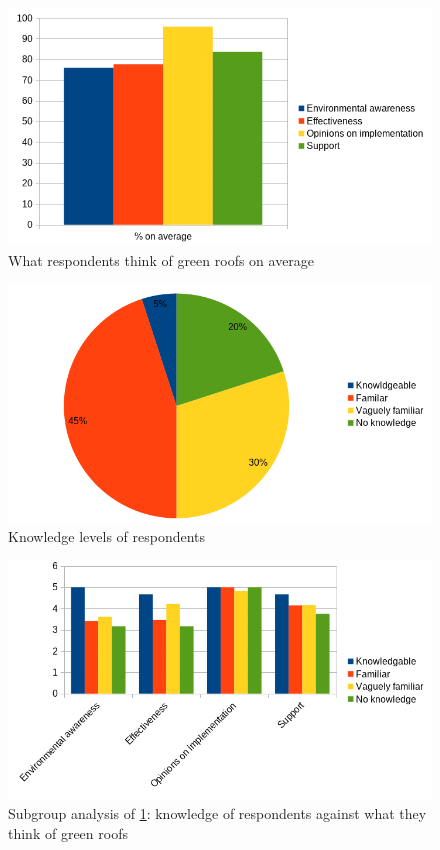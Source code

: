 \documentclass[a4paper]{article}
\begin{document}
\begin{multicols}{2}
  \begin{figure}[H]
    \Centering
    \includegraphics[width=\linewidth]{responses-ave.png}
    \caption{What respondents think of green roofs on average}
    \label{fig:surv-resp}
  \end{figure}

  \begin{figure}[H]
    \Centering
    \includegraphics[width=\linewidth]{knowledge.png}
    \caption{Knowledge levels of respondents}
    \label{fig:know-levels}
  \end{figure}

  \begin{figure}[H]
    \Centering
    \includegraphics[width=\linewidth]{knowledge-opinions.png}
    \caption{
      Subgroup analysis of \cref{fig:surv-resp}: knowledge of respondents
      against what they think of green roofs
    }
    \label{fig:know-opn}
  \end{figure}


\end{multicols}
\end{document}

